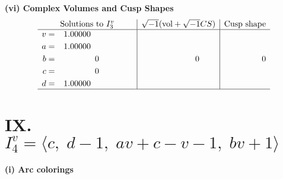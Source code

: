 \documentclass[1p]{elsarticle_modified}
\theoremstyle{definition}
\newcommand{\I}{\sqrt{-1}}
\begin{document}
\newpage\flushleft \textbf{(vi) Complex Volumes and Cusp Shapes}
$$\begin{array}{c|c|c}  
\text{Solutions to }I^v_{3}& \I (\text{vol} + \sqrt{-1}CS) & \text{Cusp shape}\\
 \hline 
\begin{aligned}
v &= \phantom{-}1.00000\phantom{ +0.000000I} \\
a &= \phantom{-}1.00000\phantom{ +0.000000I} \\
b &= \phantom{-0.000000 } 0 \\
c &= \phantom{-0.000000 } 0 \\
d &= \phantom{-}1.00000\phantom{ +0.000000I}\end{aligned}
 & \phantom{-0.000000 } 0 & \phantom{-0.000000 } 0\\
 \hline 
 \end{array}$$\newpage\newpage\renewcommand{\arraystretch}{1}
\centering \section*{IX. $I^v_{4}= \langle c,\;d-1,\;a v+c- v-1,\;b v+1 \rangle$}
\flushleft \textbf{(i) Arc colorings}\\
\end{document}
